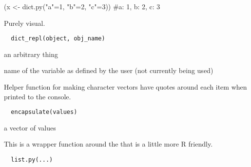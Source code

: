 \documentclass[a4paper]{book}
\begin{document}
%
\begin{Examples}
\begin{ExampleCode}
(x <- dict.py("a"=1, "b"=2, "c"=3))
#{a: 1, b: 2, c: 3}
\end{ExampleCode}
\end{Examples}
%
\begin{Description}\relax
Purely visual.
\end{Description}
%
\begin{Usage}
\begin{verbatim}
  dict_repl(object, obj_name)
\end{verbatim}
\end{Usage}
%
\begin{Arguments}
\begin{ldescription}
\item[\code{object}] an arbitrary thing

\item[\code{obj\_name}] name of the variable as defined by the
user (not currently being used)
\end{ldescription}
\end{Arguments}
%
\begin{Description}\relax
Helper function for making character vectors have quotes
around each item when printed to the console.
\end{Description}
%
\begin{Usage}
\begin{verbatim}
  encapsulate(values)
\end{verbatim}
\end{Usage}
%
\begin{Arguments}
\begin{ldescription}
\item[\code{values}] a vector of values
\end{ldescription}
\end{Arguments}
%
\begin{Description}\relax
This is a wrapper function around the 
that is a little more R friendly.
\end{Description}
%
\begin{Usage}
\begin{verbatim}
  list.py(...)
\end{verbatim}
\end{Usage}
\end{document}
